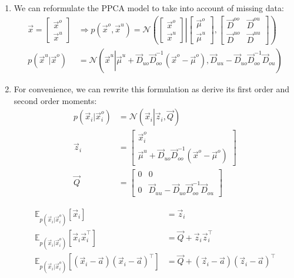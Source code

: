 \documentclass[12pt,twoside]{article}
\begin{document}
\begin{enumerate}

	\item We can reformulate the PPCA model to take into account of missing data:
		\begin{align*}
			\vec{x} = 	\begin{bmatrix}
								\vec{x}^o \\ \vec{x}^u
							\end{bmatrix}
			&\Rightarrow
			p\left(\vec{x}^o, \vec{x}^u\right) = \mathcal{N}\left(\left.
				\begin{bmatrix}
					\vec{x}^o \\ \vec{x}^u
				\end{bmatrix}
			\right\vert 
				\begin{bmatrix}
					\vec{\mu}^o \\ \vec{\mu}^u
				\end{bmatrix},
				\begin{bmatrix}
					\vec{D}^{oo} 		&\vec{D}^{ou} 		\\ 
					\vec{D}^{uo}			&\vec{D}^{uu}
				\end{bmatrix}\right)\\
				p(\vec{x}^u\vert \vec{x}^o)
				&=\mathcal{N}\left(\vec{x}^u\left \vert\vec{\mu}^u +\vec{D}_{uo}\vec{D}_{oo}^{-1}(\vec{x}^o - \vec{\mu}^o), \vec{D}_{uu}-\vec{D}_{uo}\vec{D}_{oo}^{-1}\vec{D}_{ou}  				\right.\right )
\end{align*}

	\item For convenience, we can rewrite this formulation as derive its first order and second order moments:
		\begin{align*}
			p(\vec{x}_i\vert \vec{x}_i^o)  &= \mathcal{N} \left(\vec{x}_i\left\vert \vec{z}_i, \vec{Q}\right. \right)\\
			\vec{z}_i &=\begin{bmatrix}
			\vec{x}_i^o\\
			\vec{\mu}^u +\vec{D}_{uo}\vec{D}_{oo}^{-1}(\vec{x}^o - \vec{\mu}^o)
			\end{bmatrix}\\
			\vec{Q} & = \begin{bmatrix}
			0	&	0\\
			0	& 	\vec{D}_{uu}-\vec{D}_{uo}\vec{D}_{oo}^{-1}\vec{D}_{ou} 
			\end{bmatrix}
		\end{align*}		
		
		\begin{align*}
			\mathbb{E}_{p(\vec{x}_i\vert \vec{x}_i^o)}[\vec{x}_i] &=\vec{z}_i\\
			\mathbb{E}_{p(\vec{x}_i\vert \vec{x}_i^o)}[\vec{x}_i\vec{x}_i^\top] &=\vec{Q}+\vec{z}_i\vec{z}_i^\top\\
			\mathbb{E}_{p(\vec{x}_i\vert \vec{x}_i^o)}[(\vec{x}_i-\vec{a})(\vec{x}_i-\vec{a})^\top] &=\vec{Q}+(\vec{z}_i-\vec{a})(\vec{z}_i-\vec{a})^\top\\ 
		\end{align*}
		

\end{enumerate}
\end{document}

